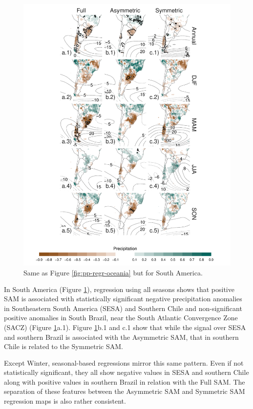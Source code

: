 \documentclass[smallextended]{svjour3}       %
\begin{document}
\begin{figure}
\includegraphics{pp-regr-america-1} \caption{Same as Figure \ref{fig:pp-regr-oceania} but for South America.}\label{fig:pp-regr-america}
\end{figure}

In South America (Figure \ref{fig:pp-regr-america}), regression using all seasons shows that positive SAM is associated with statistically significant negative precipitation anomalies in Southeastern South America (SESA) and Southern Chile and non-significant positive anomalies in South Brazil, near the South Atlantic Convergence Zone (SACZ) (Figure \ref{fig:pp-regr-america}a.1). Figure \ref{fig:pp-regr-america}b.1 and c.1 show that while the signal over SESA and southern Brazil is associated with the Asymmetric SAM, that in southern Chile is related to the Symmetric SAM.

Except Winter, seasonal-based regressions mirror this same pattern. Even if not statistically significant, they all show negative values in SESA and southern Chile along with positive values in southern Brazil in relation with the Full SAM. The separation of these features between the Asymmetric SAM and Symmetric SAM regression maps is also rather consistent.
\end{document}
